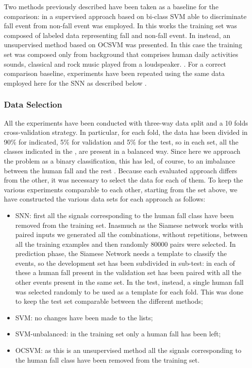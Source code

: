 Two methods previously described have been taken as a baseline for the comparison:
in  a supervised approach based on bi-class SVM able to discriminate fall event from  non-fall event was employed. In this works the training set was composed of labeled data representing fall and non-fall event. In  instead, an unsupervised method based on OCSVM was presented. In this case the training set was composed only from background that comprises human daily activities sounds, classical and rock music played from a loudspeaker.
.
For a correct comparison baseline, experiments have been repeated using the same data employed here for the SNN %
as described below .

\subsubsection{Data Selection}
\label{sec:dataselection}
All the experiments have been conducted with three-way data split and a 10 folds cross-validation strategy. In particular, for each fold, the data has been divided in 90\% for indicated, 5\% for validation and 5\% for the test, so in each set, all the classes indicated in the , are present in a balanced way. Since here we approach the problem as a binary classification, this has led, of course, to an imbalance between the human fall and the rest%
.
Because each evaluated approach differs from the other, it was necessary to select the data for each of them. To keep the various experiments comparable to each other, starting from the set above, we have constructed the various data sets for each approach as follows:
\begin{itemize}
	\item SNN: first all the signals corresponding to the human fall class have been removed from the training set. Inasmuch as the Siamese network works with paired inputs we generated all the combinations, without repetitions, between all the training examples and then randomly 80000 pairs were selected. In prediction phase, the Siamese Network needs a template to classify the events, so the development set has been subdivided in sub-test: in each of these a human fall present in the validation set has been paired with all the other events present in the same set. In the test, instead, a single human fall was selected randomly to be used as a template for each fold. This was done to keep the test set comparable between the different methods;
	\item SVM: no changes have been made to the lists;
	\item SVM-unbalanced: in the training set only a human fall has been left;
	\item OCSVM: as this is an unsupervised method all the signals corresponding to the human fall class have been removed from the training set.
\end{itemize}
